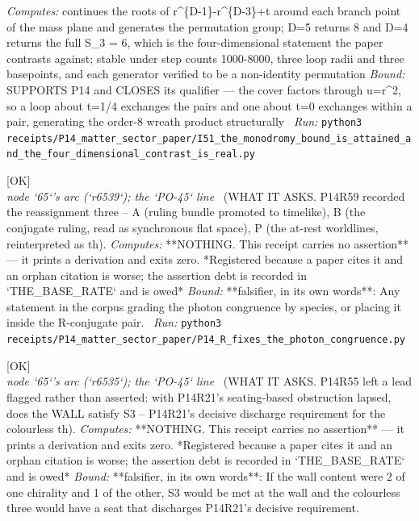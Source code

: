\begin{description}
\emph{Computes:} continues the roots of r\textasciicircum{}\{D-1\}-r\textasciicircum{}\{D-3\}+t around each branch point of the mass plane and generates the permutation group; D=5 returns 8 and D=4 returns the full S\_3 = 6, which is the four-dimensional statement the paper contrasts against; stable under step counts 1000-8000, three loop radii and three basepoints, and each generator verified to be a non-identity permutation
 \emph{Bound:} SUPPORTS P14 and CLOSES its qualifier --- the cover factors through u=r\textasciicircum{}2, so a loop about t=1/4 exchanges the pairs and one about t=0 exchanges within a pair, generating the order-8 wreath product structurally
\ \emph{Run:} \texttt{python3 receipts/P14\_matter\_sector\_paper/I51\_the\_monodromy\_bound\_is\_attained\_and\_the\_four\_dimensional\_contrast\_is\_real.py}
\item[\rcptlabel{P14_R_fixes_the_photon_congruence}{P14R55}\textbf{P14R55}\quad\texttt{P14\_R\_fixes\_the\_photon\_congruence}]\hfill\textsf{[OK]}\\
\textit{node `65`'s arc (`r6539`); the `PO-45` line} \ (WHAT IT ASKS. P14R59 recorded the reassignment three -- A (ruling bundle promoted to timelike), B (the conjugate ruling, read as synchronous flat space), P (the at-rest worldlines, reinterpreted as th). 
\emph{Computes:}  **NOTHING. This receipt carries no assertion** --- it prints a derivation and exits zero. *Registered because a paper cites it and an orphan citation is worse; the assertion debt is recorded in `THE\_BASE\_RATE` and is owed*
 \emph{Bound:} **falsifier, in its own words**: Any statement in the corpus grading the photon congruence by species, or placing it inside the R-conjugate pair.
\ \emph{Run:} \texttt{python3 receipts/P14\_matter\_sector\_paper/P14\_R\_fixes\_the\_photon\_congruence.py}
\item[\rcptlabel{P14_S3_against_the_wall_content}{P14R56}\textbf{P14R56}\quad\texttt{P14\_S3\_against\_the\_wall\_content}]\hfill\textsf{[OK]}\\
\textit{node `65`'s arc (`r6535`); the `PO-45` line} \ (WHAT IT ASKS. P14R55 left a lead flagged rather than asserted: with P14R21's seating-based obstruction lapsed, does the WALL satisfy S3 -- P14R21's decisive discharge requirement for the colourless th). 
\emph{Computes:}  **NOTHING. This receipt carries no assertion** --- it prints a derivation and exits zero. *Registered because a paper cites it and an orphan citation is worse; the assertion debt is recorded in `THE\_BASE\_RATE` and is owed*
 \emph{Bound:} **falsifier, in its own words**: If the wall content were 2 of one chirality and 1 of the other, S3 would be met at the wall and the colourless three would have a seat that discharges P14R21's decisive requirement.

\end{description}
